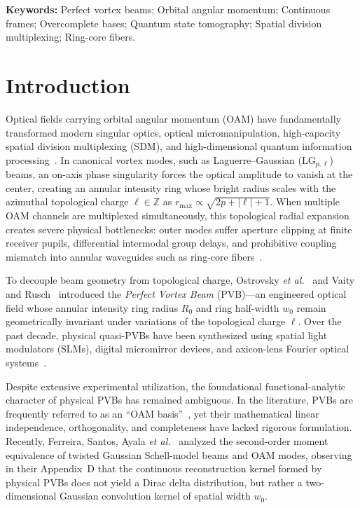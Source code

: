 \documentclass[11pt,a4paper]{article}
\begin{document}
\vspace{0.5em}
\noindent\textbf{Keywords:} Perfect vortex beams; Orbital angular momentum; Continuous frames; Overcomplete bases; Quantum state tomography; Spatial division multiplexing; Ring-core fibers.

\section{Introduction}
\label{sec:intro}

Optical fields carrying orbital angular momentum (OAM) have fundamentally transformed modern singular optics, optical micromanipulation, high-capacity spatial division multiplexing (SDM), and high-dimensional quantum information processing~\cite{Allen1992,Durnin1987,Mair2001,Dennis2009,FrankeArnold2008,Berry1998,Berry2004,Barnett2002,Padgett1999,Gbur2016,MandelWolf1995,Siegman1986}. In canonical vortex modes, such as Laguerre--Gaussian ($\text{LG}_{p, \ell}$) beams, an on-axis phase singularity forces the optical amplitude to vanish at the center, creating an annular intensity ring whose bright radius scales with the azimuthal topological charge $\ell \in \mathbb{Z}$ as $r_{\max} \propto \sqrt{2p + |\ell| + 1}$. When multiple OAM channels are multiplexed simultaneously, this topological radial expansion creates severe physical bottlenecks: outer modes suffer aperture clipping at finite receiver pupils, differential intermodal group delays, and prohibitive coupling mismatch into annular waveguides such as ring-core fibers~\cite{Villalba2023,RojasRojas2021,Canas2021,Ramachandran2009,Bozinovic2013,Willner2015,Brunet2014,Gregg2015,Zhu2018,Wang2012}.

To decouple beam geometry from topological charge, Ostrovsky \emph{et al.}~\cite{Ostrovsky2013} and Vaity and Rusch~\cite{Vaity2015} introduced the \emph{Perfect Vortex Beam} (PVB)---an engineered optical field whose annular intensity ring radius $R_0$ and ring half-width $w_0$ remain geometrically invariant under variations of the topological charge $\ell$. Over the past decade, physical quasi-PVBs have been synthesized using spatial light modulators (SLMs), digital micromirror devices, and axicon-lens Fourier optical systems~\cite{Chen2013,Reddy2016,Jabir2016,GarciaGarcia2014,Li2018PVB,PerezGarcia2017,Arrizon2007}.

Despite extensive experimental utilization, the foundational functional-analytic character of physical PVBs has remained ambiguous. In the literature, PVBs are frequently referred to as an ``OAM basis''~\cite{GarciaEscartin2008}, yet their mathematical linear independence, orthogonality, and completeness have lacked rigorous formulation. Recently, Ferreira, Santos, Ayala \emph{et al.}~\cite{Ferreira2026} analyzed the second-order moment equivalence of twisted Gaussian Schell-model beams and OAM modes, observing in their Appendix~D that the continuous reconstruction kernel formed by physical PVBs does not yield a Dirac delta distribution, but rather a two-dimensional Gaussian convolution kernel of spatial width $w_0$.
\end{document}
